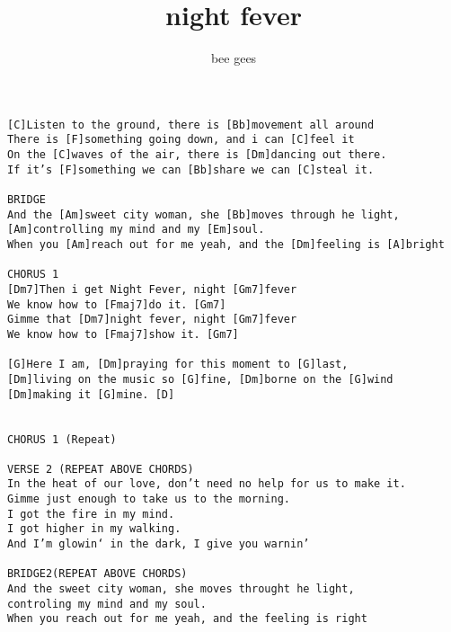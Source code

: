 \author{bee gees}
\title{night fever}
\maketitle
\begin{verbatim}
[C]Listen to the ground, there is [Bb]movement all around
There is [F]something going down, and i can [C]feel it
On the [C]waves of the air, there is [Dm]dancing out there.
If it’s [F]something we can [Bb]share we can [C]steal it.

BRIDGE
And the [Am]sweet city woman, she [Bb]moves through he light,
[Am]controlling my mind and my [Em]soul.
When you [Am]reach out for me yeah, and the [Dm]feeling is [A]bright

CHORUS 1
[Dm7]Then i get Night Fever, night [Gm7]fever
We know how to [Fmaj7]do it. [Gm7]
Gimme that [Dm7]night fever, night [Gm7]fever
We know how to [Fmaj7]show it. [Gm7]

[G]Here I am, [Dm]praying for this moment to [G]last,
[Dm]living on the music so [G]fine, [Dm]borne on the [G]wind
[Dm]making it [G]mine. [D]


CHORUS 1 (Repeat)

VERSE 2 (REPEAT ABOVE CHORDS)
In the heat of our love, don’t need no help for us to make it.
Gimme just enough to take us to the morning.
I got the fire in my mind.
I got higher in my walking.
And I’m glowin‘ in the dark, I give you warnin’

BRIDGE2(REPEAT ABOVE CHORDS)
And the sweet city woman, she moves throught he light,
controling my mind and my soul.
When you reach out for me yeah, and the feeling is right
\end{verbatim}